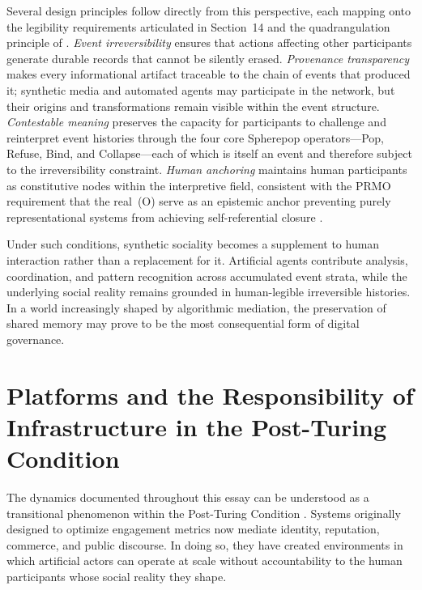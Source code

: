 \documentclass[12pt,a4paper]{article}
\begin{document}
Several design principles follow directly from this perspective, each mapping onto the
legibility requirements articulated in Section~14 and the quadrangulation principle of
\citet{jelinek2026}. \emph{Event irreversibility} ensures that actions affecting other
participants generate durable records that cannot be silently erased. \emph{Provenance
transparency} makes every informational artifact traceable to the chain of events that produced
it; synthetic media and automated agents may participate in the network, but their origins and
transformations remain visible within the event structure. \emph{Contestable meaning} preserves
the capacity for participants to challenge and reinterpret event histories through the four core
Spherepop operators---Pop, Refuse, Bind, and Collapse---each of which is itself an event and
therefore subject to the irreversibility constraint. \emph{Human anchoring} maintains human
participants as constitutive nodes within the interpretive field, consistent with the PRMO
requirement that the real~(O) serve as an epistemic anchor preventing purely representational
systems from achieving self-referential closure \citep{jelinek2026}.

Under such conditions, synthetic sociality becomes a supplement to human interaction rather than
a replacement for it. Artificial agents contribute analysis, coordination, and pattern
recognition across accumulated event strata, while the underlying social reality remains
grounded in human-legible irreversible histories. In a world increasingly shaped by algorithmic
mediation, the preservation of shared memory may prove to be the most consequential form of
digital governance.

\section{Platforms and the Responsibility of Infrastructure in the Post-Turing Condition}

The dynamics documented throughout this essay can be understood as a transitional phenomenon
within the Post-Turing Condition \citep{jelinek2026}. Systems originally designed to optimize
engagement metrics now mediate identity, reputation, commerce, and public discourse. In doing
so, they have created environments in which artificial actors can operate at scale without
accountability to the human participants whose social reality they shape.
\end{document}
